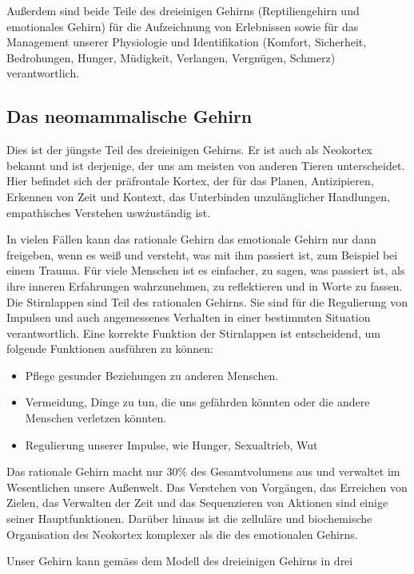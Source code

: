 \documentclass[
    invert-title=false,
    titlepage=true,
    titleimage-ratio=1011,
    parskip=half-,
]{bfhpub}                %
\begin{document}
    Außerdem sind beide Teile des dreieinigen Gehirns (Reptiliengehirn und emotionales Gehirn) für die Aufzeichnung von Erlebnissen sowie für das Management unserer Physiologie und Identifikation (Komfort, Sicherheit, Bedrohungen, Hunger, Müdigkeit, Verlangen, Vergnügen, Schmerz) verantwortlich.

    \subsection{Das neomammalische Gehirn}\label{subsec:das-neomammalische-gehirn}
    Dies ist der jüngste Teil des dreieinigen Gehirns.
    Er ist auch als Neokortex bekannt und ist derjenige, der uns am meisten von anderen Tieren unterscheidet.
    Hier befindet sich der präfrontale Kortex, der für das Planen, Antizipieren, Erkennen von Zeit und Kontext, das Unterbinden unzulänglicher Handlungen, empathisches Verstehen usw\. zuständig ist.

    In vielen Fällen kann das rationale Gehirn das emotionale Gehirn nur dann freigeben, wenn es weiß und versteht, was mit ihm passiert ist, zum Beispiel bei einem Trauma.
    Für viele Menschen ist es einfacher, zu sagen, was passiert ist, als ihre inneren Erfahrungen wahrzunehmen, zu reflektieren und in Worte zu fassen.
    Die Stirnlappen sind Teil des rationalen Gehirns.
    Sie sind für die Regulierung von Impulsen und auch angemessenes Verhalten in einer bestimmten Situation verantwortlich.
    Eine korrekte Funktion der Stirnlappen ist entscheidend, um folgende Funktionen ausführen zu können:
    \begin{itemize}
        \item Pflege gesunder Beziehungen zu anderen Menschen.
        \item Vermeidung, Dinge zu tun, die uns gefährden könnten oder die andere Menschen verletzen könnten.
        \item Regulierung unserer Impulse, wie Hunger, Sexualtrieb, Wut
    \end{itemize}

    Das rationale Gehirn macht nur 30\% des Gesamtvolumens aus und verwaltet im Wesentlichen unsere Außenwelt.
    Das Verstehen von Vorgängen, das Erreichen von Zielen, das Verwalten der Zeit und das Sequenzieren von Aktionen sind einige seiner Hauptfunktionen.
    Darüber hinaus ist die zelluläre und biochemische Organisation des Neokortex komplexer als die des emotionalen Gehirns.


    \begin{bfhNoteBox}
        Unser Gehirn kann gemäss dem Modell des dreieinigen Gehirns in drei
    \end{bfhNoteBox}
\end{document}
